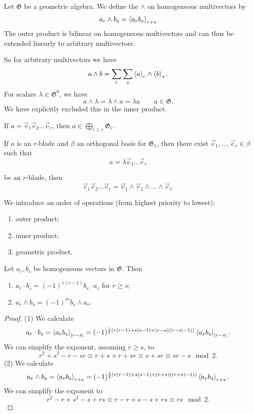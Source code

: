 \begin{definition}
Let $\mathfrak{G}$ be a geometric algebra. We define the  $\wedge$ on homogeneous multivectors by
\[ a_r\wedge b_s = \left\langle a_rb_s \right\rangle_{r+s} \]
The outer product is bilinear on homogeneous multivectors and can thus be extended linearly to arbitrary multivectors.
\end{definition}
So for arbitrary multivectors we have
\[ a\wedge b = \sum_r\sum_s \left\langle a \right\rangle_r\wedge \left\langle b \right\rangle_s. \]
For scalars $\lambda \in \mathfrak{G}^0$, we have
\[ a \wedge \lambda = \lambda\wedge a = \lambda a \qquad a \in \mathfrak{G}. \]
We have explicitly excluded this in the inner product.

\begin{lemma}
If $a = \vec{v}_1 \vec{v}_2\ldots \vec{v}_r$, then $a\in \bigoplus_{i\leq r}\mathfrak{G}_i$.

If $a$ is an $r$-blade and $\beta$ an orthogonal basis for $\mathfrak{G}_1$, then there exist $\vec{e}_1,\ldots, \vec{e}_r \in \beta$ such that
\[ a = \lambda \vec{e}_1 \ldots \vec{e}_r \]


 be an $r$-blade, then
\[\vec{v}_1 \vec{v}_2\ldots \vec{v}_r = \vec{v}_1 \wedge \vec{v}_2 \wedge\ldots\wedge \vec{v}_r.\]
\end{lemma}

\begin{note}
We introduce an order of operations (from highest priority to lowest):
\begin{enumerate}
\item outer product;
\item inner product;
\item geometric product.
\end{enumerate}
\end{note}

\begin{lemma}
Let $a_r,b_s$ be homogeneous vectors in $\mathfrak{G}$. Then
\begin{enumerate}
\item $a_r\cdot b_s = (-1)^{s(r-1)}b_s\cdot a_r$ for $r\geq s$;
\item $a_r \wedge b_s = (-1)^{rs}b_s \wedge a_r$.
\end{enumerate}
\end{lemma}
\begin{proof}
(1) We calculate
\[ a_r\cdot b_s = \left\langle a_rb_s \right\rangle_{|r-s|} = (-1)^{\frac{1}{2}(r(r-1) + s(s-1) + |r-s|(|r-s|-1))}\left\langle a_rb_s \right\rangle_{|r-s|}. \]
We can simplify the exponent, assuming $r\geq s$, to
\[ r^2 + s^2 -r -sr \equiv r+s+r+sr \equiv s+sr \equiv sr-s \mod 2.\]
(2) We calculate
\[ a_r \wedge b_s = \left\langle a_rb_s \right\rangle_{r+s} = (-1)^{\frac{1}{2}(r(r-1) + s(s-1) + (r+s)((r+s)-1))}\left\langle a_rb_s \right\rangle_{r+s}. \]
We can simplify the exponent to
\[ r^2 -r+s^2 -s + rs \equiv r-r+s-s+rs \equiv rs \mod 2. \]
\end{proof}

